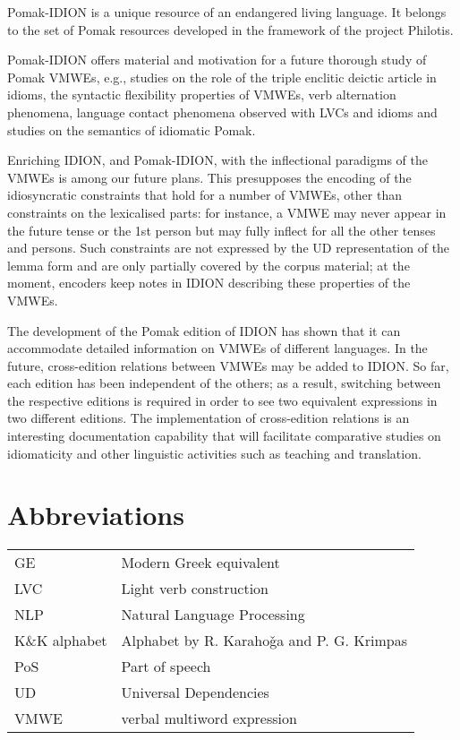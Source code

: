 \documentclass[output=paper,colorlinks,citecolor=brown]{langscibook}
\begin{document}
Pomak-IDION is a unique resource of an endangered living language.  It belongs to the set of  Pomak resources developed in the framework of the project Philotis. 

Pomak-IDION offers material and motivation for a future thorough study of Pomak VMWEs, e.g.,  studies on the role of the triple enclitic deictic article in idioms,  the syntactic flexibility properties of VMWEs, verb alternation phenomena, language contact phenomena observed with LVCs and idioms and studies on the semantics of idiomatic Pomak.

Enriching IDION, and Pomak-IDION, with the inflectional paradigms of the VMWEs is among our future plans. This presupposes the encoding of the idiosyncratic constraints that hold for a number of VMWEs, other than constraints on the lexicalised parts: for instance, a VMWE may never appear in the future tense or the 1st person but may fully inflect for all the other tenses and persons. Such constraints are not expressed by the UD representation of the lemma form and are only partially covered by the corpus material; at the moment, encoders keep notes in IDION describing these properties of the VMWEs.   

The development of the Pomak edition of IDION has shown that it can accommodate detailed information on VMWEs of different languages. In the future,  cross-edition relations between VMWEs may be added to IDION. So far, each edition has been independent of the others; as a result,  switching between the respective editions is required in order to see two equivalent expressions in two different editions. The implementation of cross-edition relations is an interesting documentation capability that will facilitate comparative studies on idiomaticity and other linguistic activities such as teaching and translation.


\section*{Abbreviations}
\begin{tabular}{@{}ll@{}}
GE              &   Modern Greek equivalent    \\ 
LVC             &   Light verb construction    \\ 
NLP             &   Natural Language Processing\\ 
K\&K alphabet   &   Alphabet by R. Karahoǧa and P. G. Krimpas\\ 
PoS             &   Part of speech             \\ 
UD              &   Universal Dependencies     \\ 
VMWE            &   verbal multiword expression\\ 
\end{tabular}
\end{document}
